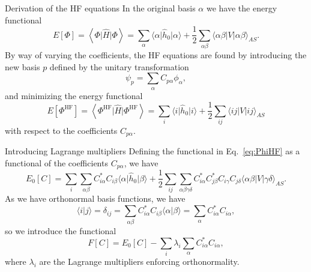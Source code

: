 \documentclass[UKenglish,aspectratio=169]{beamer}
\begin{document}
\begin{frame}{Derivation of the HF equations}
    In the original basis $\alpha$ we have the energy functional
    \begin{equation}
        E[\Phi]
        = \left\langle \Phi \vert \hat{H} \vert \Phi \right\rangle
        = \sum_{\alpha} \langle \alpha \vert \hat{h}_0 \vert \alpha \rangle
        + \frac{1}{2} \sum_{\alpha\beta} \langle \alpha\beta \vert V
        \vert \alpha \beta \rangle_{AS}.
    \end{equation}
    By way of varying the coefficients, the HF equations are found by
    introducing the new basis $p$ defined by the unitary transformation
    \begin{equation}
        \psi_p = \sum_{\alpha} C_{p\alpha} \phi_\alpha,
    \end{equation}
    and minimizing the energy functional
    \begin{equation}\label{eq:PhiHF}
        E[\Phi^\mathrm{HF}]
        = \left\langle \Phi^\mathrm{HF} \vert \hat{H} \vert
        \Phi^\mathrm{HF} \right\rangle
        = \sum_{i} \langle i \vert \hat{h}_0 \vert i \rangle +
        \frac{1}{2} \sum_{ij} \langle ij \vert V \vert ij \rangle_{AS}
    \end{equation}
    with respect to the coefficients $C_{p\alpha}$.
\end{frame}

\begin{frame}{Introducing Lagrange multipliers}
    Defining the functional in Eq.~\eqref{eq:PhiHF} as a functional
    of the coefficients $C_{p\alpha}$, we have
    \begin{equation}%
        E_0[C]
        = \sum_{i} \sum_{\alpha\beta} {
            C_{i \alpha}^*
            C_{i \beta}
            \langle \alpha \vert \hat{h}_0 \vert \beta \rangle
        }
        + \frac{1}{2} \sum_{ij} \sum_{\alpha\beta\gamma\delta} {
            C_{i \alpha}^*
            C_{j \beta}^*
            C_{i \gamma}
            C_{j \delta}
            \langle \alpha\beta \vert V \vert \gamma\delta \rangle_{AS}
        }.
    \end{equation}
    As we have orthonormal basis functions, we have
    \begin{equation}
        \langle i \vert j \rangle
        = \delta_{ij}
        = \sum_{\alpha\beta} C_{i\alpha}^* C_{i\beta}
        \langle \alpha \vert \beta \rangle
        = \sum_{\alpha} C_{i\alpha}^* C_{i\alpha},
    \end{equation}
    so we introduce the functional
    \begin{equation}
        F[C] = E_0[C] - \sum_{i} \lambda_i \sum_{\alpha}
        C_{i\alpha}^* C_{i\alpha},
    \end{equation}
    where $\lambda_i$ are the Lagrange multipliers enforcing orthonormality.
\end{frame}
\end{document}
